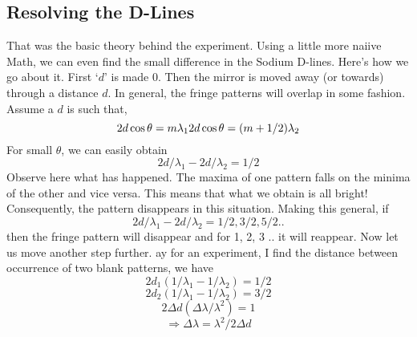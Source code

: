 	\subsection{Resolving the D-Lines}
		That was the basic theory behind the experiment. Using a little more naiive Math, we can even find the small difference in the Sodium D-lines. Here's how we go about it. First `$d$' is made 0. Then the mirror is moved away (or towards) through a distance $d$. In general, the fringe patterns will overlap in some fashion. Assume a $d$ is such that,
		\begin{equation}
			2d\cos{\theta}=m\lambda_1 \\
			2d\cos{\theta}=(m+1/2)\lambda_2
		\end{equation}
		For small $\theta$, we can easily obtain
		\begin{equation}
			2d/\lambda_1 - 2d/\lambda_2 = 1/2
		\end{equation}
		Observe here what has happened. The maxima of one pattern falls on the minima of the other and vice versa. This means that what we obtain is all bright! Consequently, the pattern disappears in this situation. Making this general, if
		\begin{equation}
			2d/\lambda_1 - 2d/\lambda_2 = 1/2, 3/2, 5/2 ..
		\end{equation}
		then the fringe pattern will disappear and for 1, 2, 3 .. it will reappear. Now let us move another step further. ay for an experiment, I find the distance between occurrence of two blank patterns, we have
		\begin{equation}
			2d_1 (1/\lambda_1 - 1/\lambda_2) = 1/2
		\end{equation}
		\begin{equation}
			2d_2 (1/\lambda_1 - 1/\lambda_2) = 3/2
		\end{equation}
		\begin{equation}
			2\Delta d (\Delta \lambda / \lambda^2) = 1
		\end{equation}
		\begin{equation}
			\Rightarrow \Delta \lambda = \lambda^2/2\Delta d
		\end{equation}

